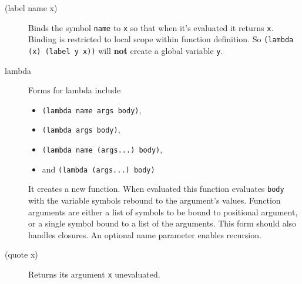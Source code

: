 \documentclass[12pt]{article}
\begin{document}
\begin{description}
\item[(label name x)] Binds the symbol \verb!name! to \verb!x! so that when it's
  evaluated it returns \verb!x!. Binding is restricted to local scope within
  function definition. So \verb!(lambda (x) (label y x))! will \textbf{not}
  create a global variable \verb!y!.

\item[lambda] Forms for lambda include
  \begin{itemize}
    \item \verb!(lambda name args body)!,
    \item \verb!(lambda args body)!,
    \item \verb!(lambda name (args...) body)!,
    \item and \verb!(lambda (args...) body)!
  \end{itemize}

  It creates a new function. When evaluated this function evaluates \verb!body!
  with the variable symbols rebound to the argument's values. Function arguments
  are either a list of symbols to be bound to positional argument, or a single
  symbol bound to a list of the arguments. This form should also handles
  closures. An optional name parameter enables recursion.

\item[(quote x)] Returns its argument \verb!x! unevaluated.
\end{description}
\end{document}
